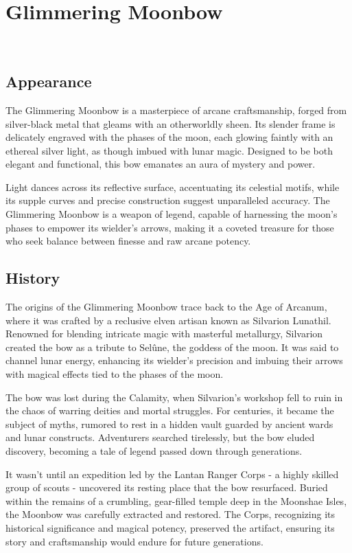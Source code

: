 
\chapter*{Glimmering Moonbow}
\\

\section*{Appearance}
The Glimmering Moonbow is a masterpiece of arcane craftsmanship, forged from silver-black metal that gleams with an otherworldly sheen. Its slender frame is delicately engraved with the phases of the moon, each glowing faintly with an ethereal silver light, as though imbued with lunar magic. Designed to be both elegant and functional, this bow emanates an aura of mystery and power.

Light dances across its reflective surface, accentuating its celestial motifs, while its supple curves and precise construction suggest unparalleled accuracy. The Glimmering Moonbow is a weapon of legend, capable of harnessing the moon's phases to empower its wielder's arrows, making it a coveted treasure for those who seek balance between finesse and raw arcane potency.

\section*{History}
The origins of the Glimmering Moonbow trace back to the Age of Arcanum, where it was crafted by a reclusive elven artisan known as Silvarion Lunathil. Renowned for blending intricate magic with masterful metallurgy, Silvarion created the bow as a tribute to Selûne, the goddess of the moon. It was said to channel lunar energy, enhancing its wielder's precision and imbuing their arrows with magical effects tied to the phases of the moon.

The bow was lost during the Calamity, when Silvarion's workshop fell to ruin in the chaos of warring deities and mortal struggles. For centuries, it became the subject of myths, rumored to rest in a hidden vault guarded by ancient wards and lunar constructs. Adventurers searched tirelessly, but the bow eluded discovery, becoming a tale of legend passed down through generations.

It wasn't until an expedition led by the Lantan Ranger Corps - a highly skilled group of scouts - uncovered its resting place that the bow resurfaced. Buried within the remains of a crumbling, gear-filled temple deep in the Moonshae Isles, the Moonbow was carefully extracted and restored. The Corps, recognizing its historical significance and magical potency, preserved the artifact, ensuring its story and craftsmanship would endure for future generations.

